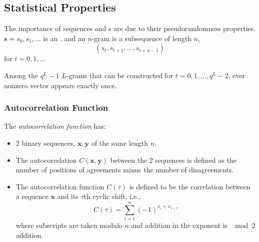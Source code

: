 









\subsection{Statistical Properties}\label{subsec:LFSR_Statistical_Properties}
The importance of  sequences and s are due to their pseudorandomness properties.
$\mathbf{s} = s_{0}, s_{1}, \ldots$ is an , and an $n$-gram is a subsequence of length $n$,
\begin{equation*}
  \left( s_{t}, s_{t+1}, \ldots, s_{t+n-1} \right)
\end{equation*}
for $t=0, 1, \ldots$

\begin{theorem}
  Among the $q^{L}-1$ $L$-grams that can be constructed for $t = 0, 1, \ldots, q^{L}-2$, ever nonzero vector appears exactly once.
\end{theorem}

\subsubsection{Autocorrelation Function}\label{subsubsec:Autocorrelation_Function}
\begin{definition}\label{def:LFSR_Autocorrelation_Function}
  The \emph{autocorrelation function} has:
  \begin{itemize}[noitemsep]
  \item 2 binary sequences, $\mathbf{x}, \mathbf{y}$ of the same length $n$.
  \item The autocorrelation $C(\mathbf{x}, \mathbf{y})$ between the 2 sequences is defined as the number of positions of agreements minus the number of disagreements.
  \item The autocorrelation function $C(\tau)$ is defined to be the correlation between a sequence $\mathbf{x}$ and its $\tau$th cyclic shift, i.e.,
    \begin{equation}\label{eq:LFSR_Autocorrelation_Function}
      C(\tau) = \sum\limits_{i=1}^{n} {(-1)}^{x_{i}+x_{i+\tau}}
    \end{equation}
    where subscripts are taken modulo $n$ and addition in the exponent is $\mod{2}$ addition.
  \end{itemize}
\end{definition}

